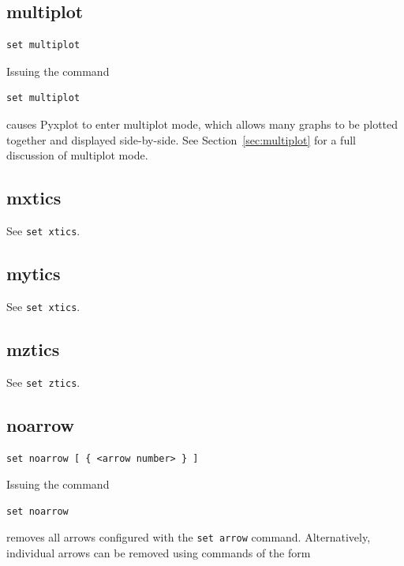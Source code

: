 \subsection{multiplot}

\begin{verbatim}
set multiplot
\end{verbatim}

Issuing the command

\begin{verbatim}
set multiplot
\end{verbatim}

\noindent causes Pyxplot to enter multiplot mode, which allows many graphs to
be plotted together and displayed side-by-side. See Section~\ref{sec:multiplot}
for a full discussion of multiplot mode.


\subsection{mxtics}

See {\tt set xtics}.


\subsection{mytics}

See {\tt set xtics}.


\subsection{mztics}

See {\tt set ztics}.


\subsection{noarrow}

\begin{verbatim}
set noarrow [ { <arrow number> } ]
\end{verbatim}

Issuing the command

\begin{verbatim}
set noarrow
\end{verbatim}

\noindent removes all arrows configured with the {\tt set arrow} command.
Alternatively, individual arrows can be removed using commands of the form

